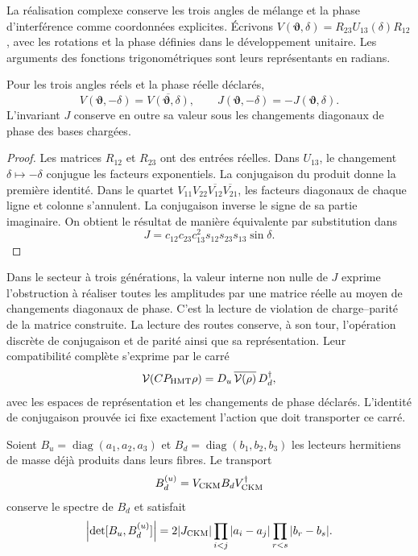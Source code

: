 La réalisation complexe conserve les trois angles de mélange et
la phase d'interférence comme coordonnées explicites. Écrivons
\(V(\boldsymbol\vartheta,\delta)
=R_{23}U_{13}(\delta)R_{12}\), avec les rotations et la phase
définies dans le développement unitaire. Les arguments des
fonctions trigonométriques sont leurs représentants en radians.

\begin{proposition}
\label{ii:prop:ii09-conjugacion-unitaria}
Pour les trois angles réels et la phase réelle déclarés,
\[
 V(\boldsymbol\vartheta,-\delta)
       =\overline{V(\boldsymbol\vartheta,\delta)},
 \qquad
 J(\boldsymbol\vartheta,-\delta)
       =-J(\boldsymbol\vartheta,\delta).
\]
L'invariant \(J\) conserve en outre sa valeur sous les changements
diagonaux de phase des bases chargées.
\end{proposition}
\begin{proof}
Les matrices \(R_{12}\) et \(R_{23}\) ont des entrées réelles.
Dans \(U_{13}\), le changement \(\delta\mapsto-\delta\) conjugue
les facteurs exponentiels. La conjugaison du produit donne la
première identité. Dans le quartet
\(V_{11}V_{22}\overline{V_{12}}\overline{V_{21}}\), les
facteurs diagonaux de chaque ligne et colonne s'annulent. La
conjugaison inverse le signe de sa partie imaginaire. On obtient
le résultat de manière équivalente par substitution dans
\[
 J=c_{12}c_{23}c_{13}^{2}s_{12}s_{23}s_{13}\sin\delta.
\]
\end{proof}

Dans le secteur à trois générations, la valeur interne non nulle de
\(J\) exprime l'obstruction à réaliser toutes les amplitudes
par une matrice réelle au moyen de changements diagonaux de phase. C'est
la lecture de violation de charge--parité de la matrice
construite. La lecture des routes conserve, à son tour, l'opération
discrète de conjugaison et de parité ainsi que sa représentation. Leur
compatibilité complète s'exprime par le carré
\[
 \mathcal V(CP_{\rm HMT}\rho)
  =D_u\,\overline{\mathcal V(\rho)}\,D_d^{\dagger},
\]
avec les espaces de représentation et les changements de phase
déclarés. L'identité de conjugaison prouvée ici fixe
exactement l'action que doit transporter ce carré.



\begin{proposition}
Soient \(B_u=\operatorname{diag}(a_1,a_2,a_3)\) et
\(B_d=\operatorname{diag}(b_1,b_2,b_3)\) les lecteurs hermitiens de masse
déjà produits dans leurs fibres. Le transport
\begin{equation}
 B_d^{(u)}=V_{\rm CKM}B_dV_{\rm CKM}^{\dagger}
 \label{ii:eq:ii-ckm-mass-transport}
\end{equation}
conserve le spectre de \(B_d\) et satisfait
\begin{equation}
 \left|\det[B_u,B_d^{(u)}]\right|
 =2|J_{\rm CKM}|
   \prod_{i<j}|a_i-a_j|\prod_{r<s}|b_r-b_s|.
 \label{ii:eq:ii-ckm-commutator}
\end{equation}
\end{proposition}

